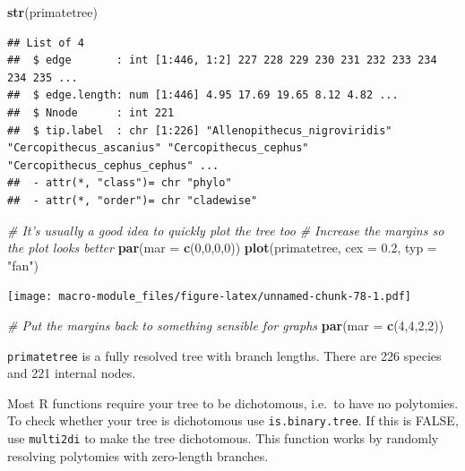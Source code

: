 \documentclass[]{book}
\newenvironment{Shaded}{\begin{snugshade}}{\end{snugshade}}
\newcommand{\KeywordTok}[1]{\textcolor[rgb]{0.13,0.29,0.53}{\textbf{{#1}}}}
\newcommand{\DataTypeTok}[1]{\textcolor[rgb]{0.13,0.29,0.53}{{#1}}}
\newcommand{\DecValTok}[1]{\textcolor[rgb]{0.00,0.00,0.81}{{#1}}}
\newcommand{\FloatTok}[1]{\textcolor[rgb]{0.00,0.00,0.81}{{#1}}}
\newcommand{\StringTok}[1]{\textcolor[rgb]{0.31,0.60,0.02}{{#1}}}
\newcommand{\CommentTok}[1]{\textcolor[rgb]{0.56,0.35,0.01}{\textit{{#1}}}}
\newcommand{\NormalTok}[1]{{#1}}
\theoremstyle{definition}
\theoremstyle{definition}
\theoremstyle{definition}
\theoremstyle{remark}
\begin{document}
\begin{Shaded}
\begin{Highlighting}[]
\KeywordTok{str}\NormalTok{(primatetree)}
\end{Highlighting}
\end{Shaded}

\begin{verbatim}
## List of 4
##  $ edge       : int [1:446, 1:2] 227 228 229 230 231 232 233 234 234 235 ...
##  $ edge.length: num [1:446] 4.95 17.69 19.65 8.12 4.82 ...
##  $ Nnode      : int 221
##  $ tip.label  : chr [1:226] "Allenopithecus_nigroviridis" "Cercopithecus_ascanius" "Cercopithecus_cephus" "Cercopithecus_cephus_cephus" ...
##  - attr(*, "class")= chr "phylo"
##  - attr(*, "order")= chr "cladewise"
\end{verbatim}

\begin{Shaded}
\begin{Highlighting}[]
\CommentTok{# It's usually a good idea to quickly plot the tree too}
\CommentTok{# Increase the margins so the plot looks better}
\KeywordTok{par}\NormalTok{(}\DataTypeTok{mar =} \KeywordTok{c}\NormalTok{(}\DecValTok{0}\NormalTok{,}\DecValTok{0}\NormalTok{,}\DecValTok{0}\NormalTok{,}\DecValTok{0}\NormalTok{))}
\KeywordTok{plot}\NormalTok{(primatetree, }\DataTypeTok{cex =} \FloatTok{0.2}\NormalTok{, }\DataTypeTok{typ =} \StringTok{"fan"}\NormalTok{)}
\end{Highlighting}
\end{Shaded}

\texttt{[image: macro-module\_files/figure-latex/unnamed-chunk-78-1.pdf]}

\begin{Shaded}
\begin{Highlighting}[]
\CommentTok{# Put the margins back to something sensible for graphs}
\KeywordTok{par}\NormalTok{(}\DataTypeTok{mar =} \KeywordTok{c}\NormalTok{(}\DecValTok{4}\NormalTok{,}\DecValTok{4}\NormalTok{,}\DecValTok{2}\NormalTok{,}\DecValTok{2}\NormalTok{))}
\end{Highlighting}
\end{Shaded}

\texttt{primatetree} is a fully resolved tree with branch lengths. There
are 226 species and 221 internal nodes.

Most R functions require your tree to be dichotomous, i.e.~to have no
polytomies. To check whether your tree is dichotomous use
\texttt{is.binary.tree}. If this is FALSE, use \texttt{multi2di} to make
the tree dichotomous. This function works by randomly resolving
polytomies with zero-length branches.
\end{document}
